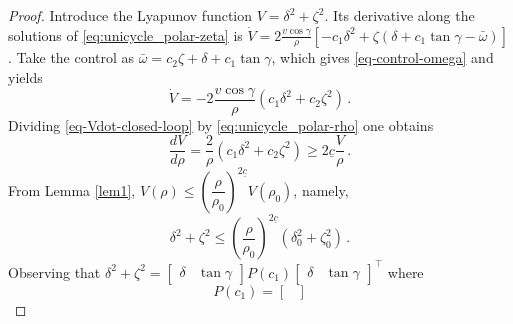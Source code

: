 \documentclass[letterpaper, 10 pt, conference]{ieeeconf}  %
\begin{document}
\begin{proof}
Introduce the Lyapunov function $V = \delta^2 + \zeta^2$. Its derivative along the solutions of \eqref{eq:unicycle_polar-zeta} is $\dot V = 2 \frac{v\cos\gamma}{\rho}\left[
-c_1\delta^2 +\zeta\left(\delta+c_1\tan\gamma - \bar\omega\right)
\right]$.
Take the control as $\bar\omega = 
c_2 \zeta + \delta + c_1\tan \gamma $, which gives \eqref{eq-control-omega} and yields
\begin{equation}
\label{eq-Vdot-closed-loop}
\dot V = -2 \frac{v\cos\gamma}{\rho}\left(
c_1\delta^2 +c_2\zeta^2\right)\,.
\end{equation}
Dividing \eqref{eq-Vdot-closed-loop} by \eqref{eq:unicycle_polar-rho} one obtains
\begin{equation}
\frac{dV}{d\rho} = \frac{2}{\rho}\left(
c_1\delta^2 +c_2\zeta^2\right) \geq 2\underline c \frac{V}{\rho}\,. \label{eq:dVdrho}
\end{equation}
From Lemma \ref{lem1}, $V(\rho) \leq \left(\dfrac{\rho}{\rho_0}\right)^{2\underline c} V(\rho_0)$, namely,
\begin{equation}
\label{eq-tandelrho0}
\delta^2+\zeta^2 \leq \left(\frac{\rho}{\rho_0}\right)^{2\underline c} \left(\delta^2_0+\zeta^2_0\right)\,.
\end{equation}
Observing that $\delta^2 + \zeta^2 = \begin{bmatrix}\delta &\tan \gamma\end{bmatrix} P(c_1)  \begin{bmatrix}\delta &\tan \gamma\end{bmatrix}^\top$ where
\begin{equation}
P(c_1) = \begin{bmatrix}

\end{bmatrix}
\end{equation}
\end{proof}
\end{document}
